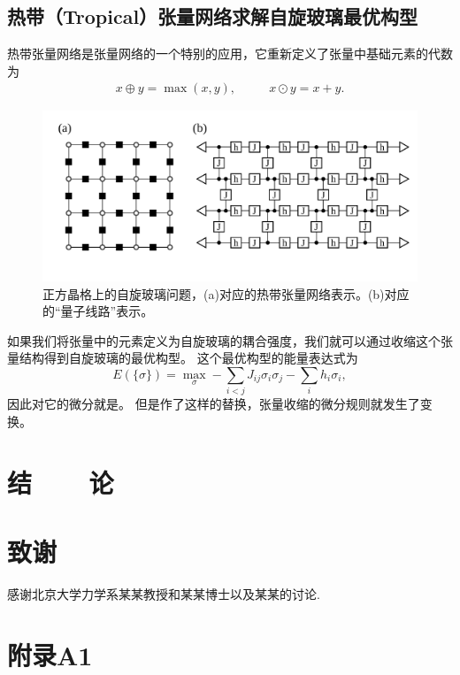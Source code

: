 \documentclass[A4,twoside,fontset=ubuntu,UTF8]{ctexart}
\begin{document}
\subsection{热带（Tropical）张量网络求解自旋玻璃最优构型}
热带张量网络是张量网络的一个特别的应用，它重新定义了张量中基础元素的代数为
\begin{eqnarray}
x \oplus y  = \max(x, y),\,\,\,\,\,\,\,\,\,\,\,\, \,\,\,\,
x \odot y   =  x + y. \label{eq:max-sum-alg}
\end{eqnarray}
\begin{figure}[t]
\centering
\includegraphics[width=\columnwidth]{./transform12.pdf}
    \caption{正方晶格上的自旋玻璃问题，(a)对应的热带张量网络表示。(b)对应的“量子线路”表示。\label{fig:performance}} 
\end{figure}
如果我们将张量中的元素定义为自旋玻璃的耦合强度，我们就可以通过收缩这个张量结构得到自旋玻璃的最优构型。
这个最优构型的能量表达式为
\begin{equation}
    E(\{\sigma\}) = \max\limits_{\sigma}-\sum_{i < j }J_{ij} \sigma_i \sigma_j  - \sum_i h_i \sigma_i,
\label{eq:spinglassopt}
\end{equation}
    因此对它的微分就是。
但是作了这样的替换，张量收缩的微分规则就发生了变换。

\section{结~~~~论}

\section*{致谢}

感谢北京大学力学系某某教授和某某博士以及某某的讨论.


\section*{附录A1}
\end{document}
